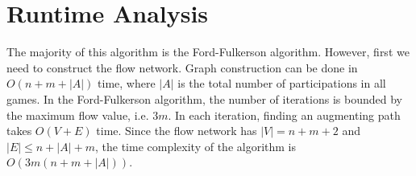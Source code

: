 \documentclass{article}
\begin{document}
\section{Runtime Analysis}

The majority of this algorithm is the Ford-Fulkerson algorithm.
However, first we need to construct the flow network.
Graph construction can be done in $O(n + m + |A|)$ time, where $|A|$ is the total number of participations in all games.
In the Ford-Fulkerson algorithm, the number of iterations is bounded by the maximum flow value, i.e. $3m$.
In each iteration, finding an augmenting path takes $O(V + E)$ time.
Since the flow network has $|V| = n + m + 2$ and $|E| \leq n + |A| + m$, the time complexity of the algorithm is $O(3m(n + m + |A|))$.
\end{document}
